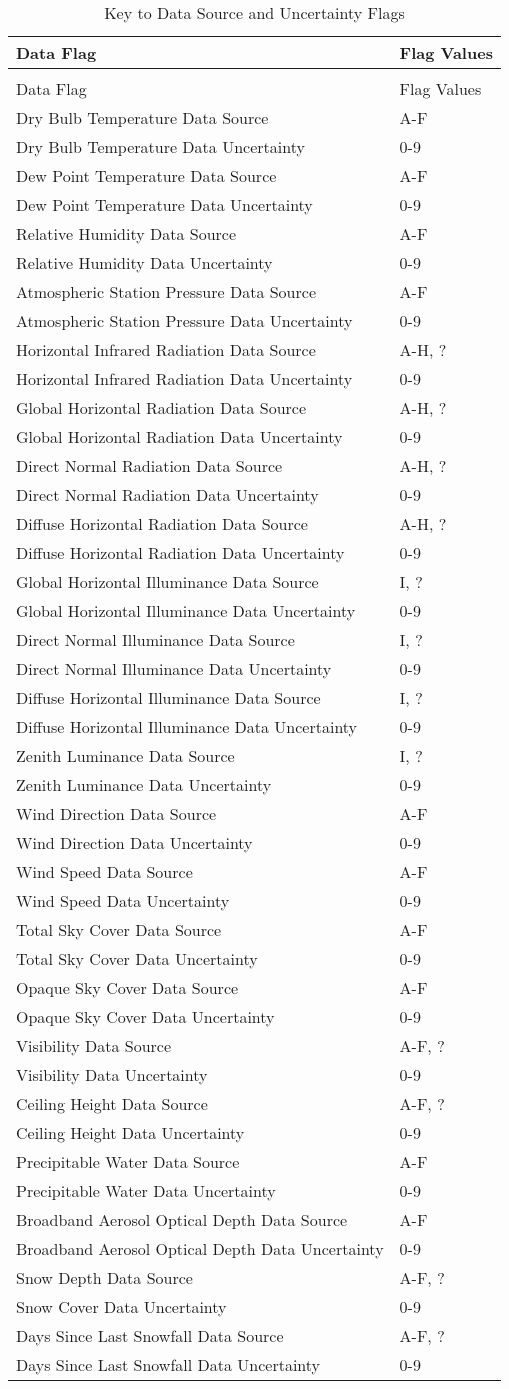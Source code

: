 \begin{longtable}[c]{@{}ll@{}}
\caption{Key to Data Source and Uncertainty Flags \label{table:key-to-data-source-and-uncertainty-flags}} \tabularnewline
\toprule 
Data Flag & Flag Values \tabularnewline \midrule
\endfirsthead

\caption[]{Key to Data Source and Uncertainty Flags} \tabularnewline
\toprule 
Data Flag & Flag Values \tabularnewline \midrule
\endhead

Dry Bulb Temperature Data Source & A-F \tabularnewline
Dry Bulb Temperature Data Uncertainty & 0-9 \tabularnewline
Dew Point Temperature Data Source & A-F \tabularnewline
Dew Point Temperature Data Uncertainty & 0-9 \tabularnewline
Relative Humidity Data Source & A-F \tabularnewline
Relative Humidity Data Uncertainty & 0-9 \tabularnewline
Atmospheric Station Pressure Data Source & A-F \tabularnewline
Atmospheric Station Pressure Data Uncertainty & 0-9 \tabularnewline
Horizontal Infrared Radiation Data Source & A-H, ? \tabularnewline
Horizontal Infrared Radiation Data Uncertainty & 0-9 \tabularnewline
Global Horizontal Radiation Data Source & A-H, ? \tabularnewline
Global Horizontal Radiation Data Uncertainty & 0-9 \tabularnewline
Direct Normal Radiation Data Source & A-H, ? \tabularnewline
Direct Normal Radiation Data Uncertainty & 0-9 \tabularnewline
Diffuse Horizontal Radiation Data Source & A-H, ? \tabularnewline
Diffuse Horizontal Radiation Data Uncertainty & 0-9 \tabularnewline
Global Horizontal Illuminance Data Source & I, ? \tabularnewline
Global Horizontal Illuminance Data Uncertainty & 0-9 \tabularnewline
Direct Normal Illuminance Data Source & I, ? \tabularnewline
Direct Normal Illuminance Data Uncertainty & 0-9 \tabularnewline
Diffuse Horizontal Illuminance Data Source & I, ? \tabularnewline
Diffuse Horizontal Illuminance Data Uncertainty & 0-9 \tabularnewline
Zenith Luminance Data Source & I, ? \tabularnewline
Zenith Luminance Data Uncertainty & 0-9 \tabularnewline
Wind Direction Data Source & A-F \tabularnewline
Wind Direction Data Uncertainty & 0-9 \tabularnewline
Wind Speed Data Source & A-F \tabularnewline
Wind Speed Data Uncertainty & 0-9 \tabularnewline
Total Sky Cover Data Source & A-F \tabularnewline
Total Sky Cover Data Uncertainty & 0-9 \tabularnewline
Opaque Sky Cover Data Source & A-F \tabularnewline
Opaque Sky Cover Data Uncertainty & 0-9 \tabularnewline
Visibility Data Source & A-F, ? \tabularnewline
Visibility Data Uncertainty & 0-9 \tabularnewline
Ceiling Height Data Source & A-F, ? \tabularnewline
Ceiling Height Data Uncertainty & 0-9 \tabularnewline
Precipitable Water Data Source & A-F \tabularnewline
Precipitable Water Data Uncertainty & 0-9 \tabularnewline
Broadband Aerosol Optical Depth Data Source & A-F \tabularnewline
Broadband Aerosol Optical Depth Data Uncertainty & 0-9 \tabularnewline
Snow Depth Data Source & A-F, ? \tabularnewline
Snow Cover Data Uncertainty & 0-9 \tabularnewline
Days Since Last Snowfall Data Source & A-F, ? \tabularnewline
Days Since Last Snowfall Data Uncertainty & 0-9 \tabularnewline
\bottomrule
\end{longtable}

